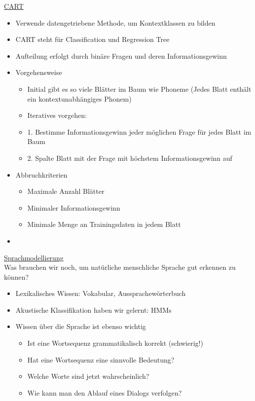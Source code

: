 \documentclass[a4paper,10pt,oneside]{article}
\begin{document}
\underline{CART} \\
	\begin{itemize}
		\item Verwende datengetriebene Methode, um Kontextklassen zu bilden
		\item CART steht für Classification und Regression Tree
		\item Aufteilung erfolgt durch binäre Fragen und deren Informationsgewinn
		\item Vorgehensweise
			\begin{itemize}
				\item Initial gibt es so viele Blätter im Baum wie Phoneme (Jedes Blatt enthält ein kontextunabhängiges Phonem)
				\item Iteratives vorgehen:
				\item 1. Bestimme Informationsgewinn jeder möglichen Frage für jedes Blatt im Baum
				\item 2. Spalte Blatt mit der Frage mit höchstem Informationsgewinn auf
			\end{itemize}
		\item Abbruchkriterien
			\begin{itemize}
				\item Maximale Anzahl Blätter
				\item Minimaler Informationsgewinn
				\item Minimale Menge an Trainingsdaten in jedem Blatt
			\end{itemize}
		\item[] %
	\end{itemize}

\underline{Sprachmodellierung} \\
Was brauchen wir noch, um natürliche menschliche Sprache gut erkennen zu können?
	\begin{itemize}
		\item Lexikalisches Wissen: Vokabular, Aussprachewörterbuch
		\item Akustische Klassifikation haben wir gelernt: HMMs
		\item Wissen über die Sprache ist ebenso wichtig
			\begin{itemize}
				\item Ist eine Wortsequenz grammatikalisch korrekt (schwierig!)
				\item Hat eine Wortsequenz eine sinnvolle Bedeutung?
				\item Welche Worte sind jetzt wahrscheinlich?
				\item Wie kann man den Ablauf eines Dialogs verfolgen?
			\end{itemize}			 
	\end{itemize}
	
\end{document}
